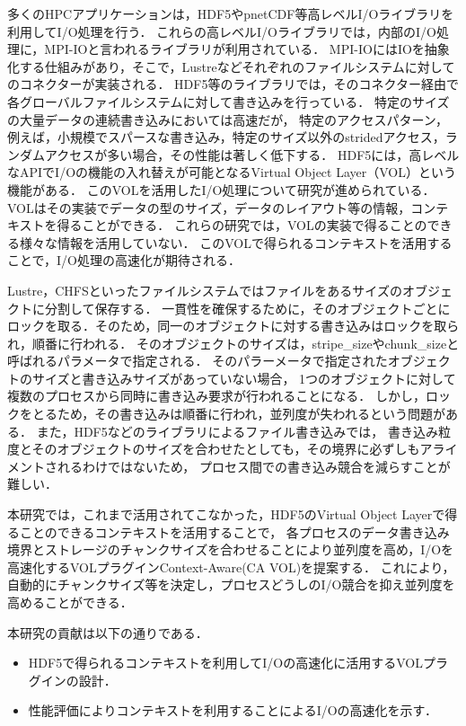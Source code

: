 \documentclass[submit,techrep,noauthor]{ipsj}
\begin{document}
多くのHPCアプリケーションは，HDF5\cite{hdf5}やpnetCDF\cite{pnetcdf}等高レベルI/Oライブラリを利用してI/O処理を行う\cite{byna2020exahdf5}．
これらの高レベルI/Oライブラリでは，内部のI/O処理に，MPI-IOと言われるライブラリが利用されている．
MPI-IOにはIOを抽象化する仕組みがあり，そこで，Lustreなどそれぞれのファイルシステムに対してのコネクターが実装される．
HDF5等のライブラリでは，そのコネクター経由で各グローバルファイルシステムに対して書き込みを行っている．
特定のサイズの大量データの連続書き込みにおいては高速だが，
特定のアクセスパターン，例えば，小規模でスパースな書き込み，特定のサイズ以外のstridedアクセス，ランダムアクセスが多い場合，その性能は著しく低下する．
HDF5には，高レベルなAPIでI/Oの機能の入れ替えが可能となるVirtual Object Layer（VOL）という機能がある．
このVOLを活用したI/O処理について研究が進められている\cite{zheng2022hdf5,tang2021transparent,soumagne2021accelerating}．
VOLはその実装でデータの型のサイズ，データのレイアウト等の情報，コンテキストを得ることができる．
これらの研究では，VOLの実装で得ることのできる様々な情報を活用していない．
このVOLで得られるコンテキストを活用することで，I/O処理の高速化が期待される．

Lustre\cite{Lustre}，CHFS\cite{tatebe2022chfs}といったファイルシステムではファイルをあるサイズのオブジェクトに分割して保存する．
一貫性を確保するために，そのオブジェクトごとにロックを取る．そのため，同一のオブジェクトに対する書き込みはロックを取られ，順番に行われる．
そのオブジェクトのサイズは，stripe\_sizeやchunk\_sizeと呼ばれるパラメータで指定される．
そのパラーメータで指定されたオブジェクトのサイズと書き込みサイズがあっていない場合，
1つのオブジェクトに対して複数のプロセスから同時に書き込み要求が行われることになる．
しかし，ロックをとるため，その書き込みは順番に行われ，並列度が失われるという問題がある．
また，HDF5などのライブラリによるファイル書き込みでは，
書き込み粒度とそのオブジェクトのサイズを合わせたとしても，その境界に必ずしもアライメントされるわけではないため，
プロセス間での書き込み競合を減らすことが難しい．

本研究では，これまで活用されてこなかった，HDF5のVirtual Object Layerで得ることのできるコンテキストを活用することで，
各プロセスのデータ書き込み境界とストレージのチャンクサイズを合わせることにより並列度を高め，I/Oを高速化するVOLプラグインContext-Aware(CA VOL)を提案する．
これにより，自動的にチャンクサイズ等を決定し，プロセスどうしのI/O競合を抑え並列度を高めることができる．

本研究の貢献は以下の通りである．
\begin{itemize}
	\item HDF5で得られるコンテキストを利用してI/Oの高速化に活用するVOLプラグインの設計．
	\item 性能評価によりコンテキストを利用することによるI/Oの高速化を示す．
\end{itemize}
\end{document}
